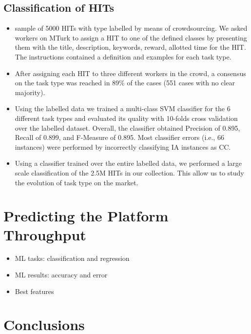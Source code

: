 \documentclass{sig-alternate}
\begin{document}
\subsection{Classification of HITs}
\begin{itemize}

	\item sample of 5000 HITs with type labelled by means of crowdsourcing. We asked workers on MTurk to assign a HIT to one of the defined classes by presenting them with the title, description, keywords, reward, allotted time for the HIT. The instructions contained a definition and examples for each task type.

	\item After assigning each HIT to three different workers in the crowd, a consensus on the task type was reached in 89\% of the cases (551 cases with no clear majority).

	\item Using the labelled data we trained a multi-class SVM classifier for the 6 different task types and evaluated its quality with 10-folds cross validation over the labelled dataset. Overall, the classifier obtained Precision of 0.895, Recall of 0.899, and F-Measure of 0.895. Most classifier errors (i.e., 66 instances) were performed by incorrectly classifying IA instances as CC.

	\item Using a classifier trained over the entire labelled data, we performed a large scale classification of the 2.5M HITs in our collection. This allow us to study the evolution of task type on the market.

\end{itemize}






\section{Predicting the Platform Throughput}
\begin{itemize}

	\item ML tasks: classification and regression

	\item ML results: accuracy and error

	\item Best features

\end{itemize}

\section{Conclusions}
\end{document}
